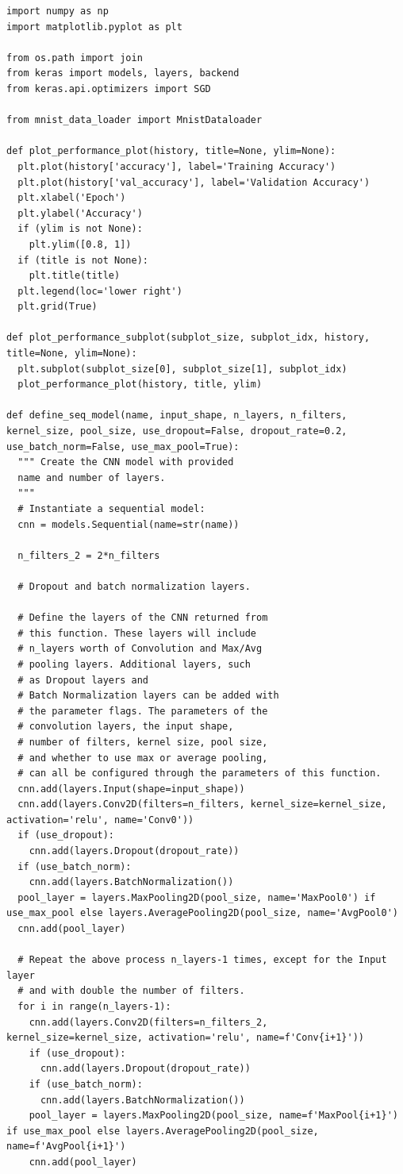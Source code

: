 \documentclass[a4paper]{article}
\begin{document}
\begin{lstlisting}[basicstyle= \scriptsize]
import numpy as np
import matplotlib.pyplot as plt

from os.path import join
from keras import models, layers, backend
from keras.api.optimizers import SGD

from mnist_data_loader import MnistDataloader

def plot_performance_plot(history, title=None, ylim=None):
  plt.plot(history['accuracy'], label='Training Accuracy')
  plt.plot(history['val_accuracy'], label='Validation Accuracy')
  plt.xlabel('Epoch')
  plt.ylabel('Accuracy')
  if (ylim is not None):
    plt.ylim([0.8, 1])
  if (title is not None):
    plt.title(title)
  plt.legend(loc='lower right')
  plt.grid(True)
  
def plot_performance_subplot(subplot_size, subplot_idx, history, title=None, ylim=None):
  plt.subplot(subplot_size[0], subplot_size[1], subplot_idx)
  plot_performance_plot(history, title, ylim)

def define_seq_model(name, input_shape, n_layers, n_filters, kernel_size, pool_size, use_dropout=False, dropout_rate=0.2, use_batch_norm=False, use_max_pool=True):
  """ Create the CNN model with provided
  name and number of layers.
  """
  # Instantiate a sequential model:
  cnn = models.Sequential(name=str(name))

  n_filters_2 = 2*n_filters
  
  # Dropout and batch normalization layers.

  # Define the layers of the CNN returned from 
  # this function. These layers will include
  # n_layers worth of Convolution and Max/Avg 
  # pooling layers. Additional layers, such
  # as Dropout layers and 
  # Batch Normalization layers can be added with
  # the parameter flags. The parameters of the 
  # convolution layers, the input shape, 
  # number of filters, kernel size, pool size, 
  # and whether to use max or average pooling,
  # can all be configured through the parameters of this function.
  cnn.add(layers.Input(shape=input_shape))
  cnn.add(layers.Conv2D(filters=n_filters, kernel_size=kernel_size, activation='relu', name='Conv0'))
  if (use_dropout):
    cnn.add(layers.Dropout(dropout_rate))
  if (use_batch_norm):
    cnn.add(layers.BatchNormalization())
  pool_layer = layers.MaxPooling2D(pool_size, name='MaxPool0') if use_max_pool else layers.AveragePooling2D(pool_size, name='AvgPool0')
  cnn.add(pool_layer)

  # Repeat the above process n_layers-1 times, except for the Input layer
  # and with double the number of filters. 
  for i in range(n_layers-1):
    cnn.add(layers.Conv2D(filters=n_filters_2, kernel_size=kernel_size, activation='relu', name=f'Conv{i+1}'))
    if (use_dropout):
      cnn.add(layers.Dropout(dropout_rate))
    if (use_batch_norm):
      cnn.add(layers.BatchNormalization())
    pool_layer = layers.MaxPooling2D(pool_size, name=f'MaxPool{i+1}') if use_max_pool else layers.AveragePooling2D(pool_size, name=f'AvgPool{i+1}')
    cnn.add(pool_layer)


\end{lstlisting}
\end{document}
